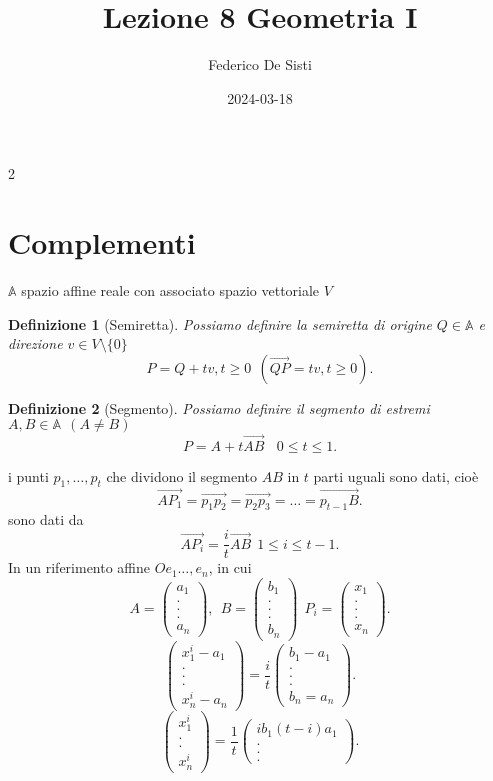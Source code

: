 \documentclass[12px]{article}
\title{Lezione 8 Geometria I}
\date{2024-03-18}
\author{Federico De Sisti}
\theoremstyle{break}
\theoremstyle{break}
\theoremstyle{break}
\newtheorem{defin}{Definizione}
\theoremstyle{break}
\theoremstyle{break}
\theoremstyle{break}
\theoremstyle{breal}
\newenvironment{defi}
{\begin{mdframed}[linecolor=orange, backgroundcolor=orange!10]\begin{defin}}
  {\end{defin}\end{mdframed}}
\newcommand{\icol}[1]{%
  \left(\begin{smallmatrix}#1\end{smallmatrix}\right)%
}
\begin{document}
2
	\maketitle
	\newpage
	\section{Complementi}
	$ \mathbb{A} $ spazio affine reale con associato spazio vettoriale $V$\\
	\begin{defi}[Semiretta]
		Possiamo definire la semiretta di origine $Q\in \mathbb{A} $ e direzione $v\in V\setminus \{0\}$
		\[
		P = Q + tv, t\geq 0\ \ (\overrightarrow{QP} = tv, t\geq 0)
		.\] 
	\end{defi}
	\begin{defi}[Segmento]
		Possiamo definire il segmento di estremi $A, B\in \mathbb{A} \ \ (A\neq B) $
		\[
		P = A + t \overrightarrow{AB} \ \ \ \ 0\leq t\leq 1
		.\] 	
	\end{defi}
	i punti $p_1,\ldots,p_t$ che dividono il segmento $AB$ in $t$ parti uguali sono dati, cioè
\[
	\overrightarrow{AP_1} = \overrightarrow{p_1p_2} = \overrightarrow{p_2p_3} = \ldots = \overrightarrow{p_{t-1}B}
.\] 
sono dati da \[
	\overrightarrow{AP_i} = \frac{i}{t}\overrightarrow{AB} \ \ 1 \leq i\leq t-1
.\] 
	In un riferimento affine $Oe_1\ldots,e_n$, in cui
	\[
		A = \icol{a_1\\ . \\.\\.\\ a_n}, \ \ B = \icol{b_1\\ .\\.\\.\\b_n} \ \ P_i = \icol{x_1\\.\\.\\.\\ x_n}
	.\] 
	\[
		\icol{x_1^i - a_1\\.\\.\\.\\x_n^i - a_n} = \frac{i}{t}\icol{b_1-a_1\\.\\.\\.\\ b_n = a_n}
	.\] 
	\[
		\icol{x_1^i\\.\\.\\x_n^i} = \frac{1}{t}\icol{ib_1 (t - i)a_1\\.\\.\\.}
	.\] 
\end{document}
